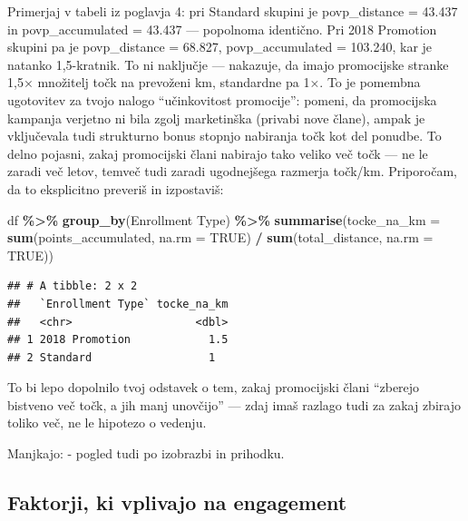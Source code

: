 \documentclass[
]{article}
\newenvironment{Shaded}{\begin{snugshade}}{\end{snugshade}}
\newcommand{\AttributeTok}[1]{\textcolor[rgb]{0.13,0.29,0.53}{#1}}
\newcommand{\ConstantTok}[1]{\textcolor[rgb]{0.56,0.35,0.01}{#1}}
\newcommand{\FunctionTok}[1]{\textcolor[rgb]{0.13,0.29,0.53}{\textbf{#1}}}
\newcommand{\NormalTok}[1]{#1}
\newcommand{\SpecialCharTok}[1]{\textcolor[rgb]{0.81,0.36,0.00}{\textbf{#1}}}
\newcommand{\StringTok}[1]{\textcolor[rgb]{0.31,0.60,0.02}{#1}}
\begin{document}
Primerjaj v tabeli iz poglavja 4: pri Standard skupini je povp\_distance
= 43.437 in povp\_accumulated = 43.437 --- popolnoma identično. Pri 2018
Promotion skupini pa je povp\_distance = 68.827, povp\_accumulated =
103.240, kar je natanko 1,5-kratnik. To ni naključje --- nakazuje, da
imajo promocijske stranke 1,5× množitelj točk na prevoženi km,
standardne pa 1×. To je pomembna ugotovitev za tvojo nalogo
``učinkovitost promocije'': pomeni, da promocijska kampanja verjetno ni
bila zgolj marketinška (privabi nove člane), ampak je vključevala tudi
strukturno bonus stopnjo nabiranja točk kot del ponudbe. To delno
pojasni, zakaj promocijski člani nabirajo tako veliko več točk --- ne le
zaradi več letov, temveč tudi zaradi ugodnejšega razmerja točk/km.
Priporočam, da to eksplicitno preveriš in izpostaviš:

\begin{Shaded}
\begin{Highlighting}[]
\NormalTok{df }\SpecialCharTok{\%\textgreater{}\%}
  \FunctionTok{group\_by}\NormalTok{(}\StringTok{\textasciigrave{}}\AttributeTok{Enrollment Type}\StringTok{\textasciigrave{}}\NormalTok{) }\SpecialCharTok{\%\textgreater{}\%}
  \FunctionTok{summarise}\NormalTok{(}\AttributeTok{tocke\_na\_km =} \FunctionTok{sum}\NormalTok{(points\_accumulated, }\AttributeTok{na.rm =} \ConstantTok{TRUE}\NormalTok{) }\SpecialCharTok{/} \FunctionTok{sum}\NormalTok{(total\_distance, }\AttributeTok{na.rm =} \ConstantTok{TRUE}\NormalTok{))}
\end{Highlighting}
\end{Shaded}

\begin{verbatim}
## # A tibble: 2 x 2
##   `Enrollment Type` tocke_na_km
##   <chr>                   <dbl>
## 1 2018 Promotion            1.5
## 2 Standard                  1
\end{verbatim}

To bi lepo dopolnilo tvoj odstavek o tem, zakaj promocijski člani
``zberejo bistveno več točk, a jih manj unovčijo'' --- zdaj imaš razlago
tudi za zakaj zbirajo toliko več, ne le hipotezo o vedenju.

Manjkajo: - pogled tudi po izobrazbi in prihodku.

\subsection{Faktorji, ki vplivajo na
engagement}\label{faktorji-ki-vplivajo-na-engagement}
\end{document}
